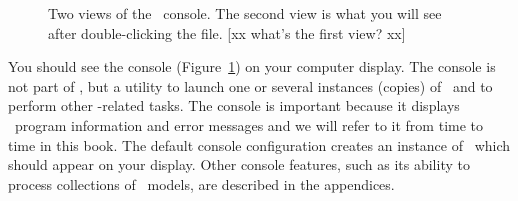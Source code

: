\begin{numberlist}
\begin{figure}[htb]
  \centering
  \caption{Two views of the \ejs\ console. The second view is what you will see after double-clicking the  file. [xx what's the first view? xx]}
  \label{fig:02EjsIntro/EjsConsole}
\end{figure}

\end{numberlist}

You should see the console (Figure~\ref{fig:02EjsIntro/EjsConsole}) on your computer display. The console is not part of
\ejs, but a utility to launch one or several instances (copies) of \ejs\ and to perform other \ejs-related
tasks.  The console is important because it displays \ejs\ program information and error messages and we will refer to it
from time to time in this book. The default console configuration creates an instance of \ejs\ which should appear on
your display. Other console features, such as its ability to process collections of \ejs\ models, are described in the
appendices.


